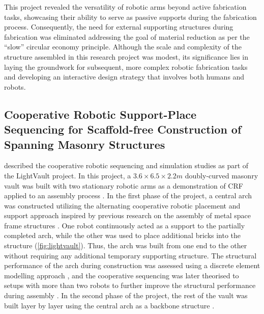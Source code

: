     This project revealed the versatility of robotic arms beyond active fabrication tasks, showcasing their ability to serve as passive supports during the fabrication process. Consequently, the need for external supporting structures during fabrication was eliminated addressing the goal of material reduction as per the ``slow'' circular economy principle. Although the scale and complexity of the structure assembled in this research project was modest, its significance lies in laying the groundwork for subsequent, more complex robotic fabrication tasks and developing an interactive design strategy that involves both humans and robots.

\subsection{Cooperative Robotic Support-Place Sequencing for Scaffold-free Construction of Spanning Masonry Structures}\label{sec:04_examples_LV}
     described the cooperative robotic sequencing and simulation studies as part of the LightVault project. In this project, a $3.6 \times 6.5 \times 2.2m$ doubly-curved masonry vault was built with two stationary robotic arms as a demonstration of CRF applied to an assembly process \citep{parascho_lightvault_2021}. In the first phase of the project, a central arch was constructed utilizing the alternating cooperative robotic placement and support approach inspired by previous research on the assembly of metal space frame structures \citep{parascho_cooperative_2017,parascho_computational_2018}. One robot continuously acted as a support to the partially completed arch, while the other was used to place additional bricks into the structure (\cref{fig:lightvault}). Thus, the arch was built from one end to the other without requiring any additional temporary supporting structure. The structural performance of the arch during construction was assessed using a discrete element modelling approach \citep{paris_robotic_2021}, and the cooperative sequencing was later theorised to setups with more than two robots to further improve the structural performance during assembly \citep{bruun_three_2021}. In the second phase of the project, the rest of the vault was built layer by layer using the central arch as a backbone structure \citep{parascho_robotic_2020,han_concept_2020}. 

